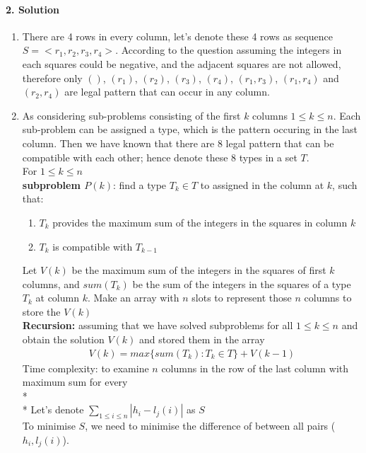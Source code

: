 \documentclass[a4paper]{scrartcl}
\begin{document}
\paragraph{2. Solution}
\label{sec:Question 2}
\begin{enumerate}[label=(\alph*)]
  \item There are 4 rows in every column, let's denote these 4 rows as sequence $S=\big<r_1,r_2,r_3,r_4\big>$.
  According to the question assuming the integers in each squares could be negative, and the adjacent squares are not allowed, therefore only $()$, $(r_1)$, $(r_2)$, $(r_3)$, $(r_4)$, $(r_1, r_3)$, $(r_1, r_4)$ and $(r_2, r_4)$ are legal pattern that can occur in any column. \\
  \item As considering sub-problems consisting of the first $k$ columns $1\leq k \leq n$. Each sub-problem can be assigned a type, which is the pattern occuring in the last column. Then we have known that there are 8 legal pattern that can be compatible with each other; hence denote these 8 types in a set $T$. \\
  For $1\leq k \leq n$\\
  \textbf{subproblem $P(k)$}: find a type $T_k \in T$ to assigned in the column at $k$, such that:
  \begin{enumerate}[label=(\arabic{*})]
    \item $T_k$ provides the maximum sum of the integers in the squares in column $k$
    \item $T_k$ is compatible with $T_{k-1}$
  \end{enumerate}
  Let $V(k)$ be the maximum sum of the integers in the squares of first $k$ columns, and $sum(T_k)$ be the sum of the integers in the squares of a type $T_k$ at column $k$.
  Make an array with $n$ slots to represent those $n$ columns to store the $V(k)$\\
\textbf{Recursion:} assuming that we have solved subproblems for all $1\leq k \leq n$ and obtain the solution $V(k)$ and stored them in the array
\begin{align*}
  V(k)=  max\{ sum(T_k) : T_k \in T \} +V(k-1)
\end{align*}
Time complexity: to examine $n$ columns in the row of the last column with maximum sum for every \\*
\\*
Let's denote $\sum_{1\leq i \leq n} |h_i - l_j(i)|$ as $S$\\
To minimise $S$, we need to minimise the difference of between all pairs ($h_i, l_j(i)$).\\

\end{enumerate}
\end{document}
